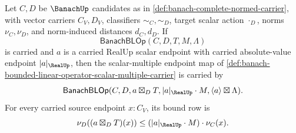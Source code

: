 \begin{theorem}
\label{thm:banach-bounded-linear-operator-scalar-multiple-closure}
Let $C,D$ be $\BanachUp$ candidates as in \autoref{def:banach-complete-normed-carrier}, with vector carriers $C_V,D_V$, classifiers $\sim_C,\sim_D$, target scalar action $\cdot_D$, norms $\nu_C,\nu_D$, and norm-induced distances $d_C,d_D$. If
$$
\mathsf{BanachBLOp}(C,D,T,M,\Lambda)
$$
is carried and $a$ is a carried RealUp scalar endpoint with carried absolute-value endpoint $|a|_{\RealUp}$, then the scalar-multiple endpoint map of \autoref{def:banach-bounded-linear-operator-scalar-multiple-carrier} is carried by
$$
\mathsf{BanachBLOp}(C,D,a\boxtimes_D T,|a|_{\RealUp}\cdot M,\langle a\rangle\boxtimes\Lambda).
$$
For every carried source endpoint $x:C_V$, its bound row is
$$
\nu_D((a\boxtimes_D T)(x))\le (|a|_{\RealUp}\cdot M)\cdot\nu_C(x).
$$
\end{theorem}

